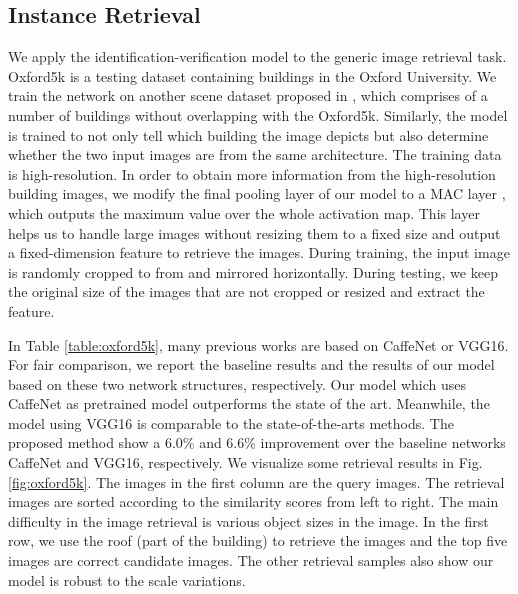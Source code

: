 \documentclass[journal]{IEEEtran}
\begin{document}
\subsection{Instance Retrieval}
We apply the identification-verification model to the generic image retrieval task. Oxford5k \cite{philbin2007object} is a testing dataset containing buildings in the Oxford University. We train the network on another scene dataset proposed in \cite{radenovic2016cnn}, which comprises of a number of buildings without overlapping with the Oxford5k. Similarly, the model is trained to not only tell which building the image depicts but also determine whether the two input images are from the same architecture. The training data is high-resolution. In order to obtain more information from the high-resolution building images, we modify the final pooling layer of our model to a MAC layer \cite{tolias2015particular}, which outputs the maximum value over the whole activation map. This layer helps us to handle large images without resizing them to a fixed size and output a fixed-dimension feature to retrieve the images. During training, the input image is randomly cropped to  from  and mirrored horizontally. During testing, we keep the original size of the images that are not cropped or resized and extract the feature.

In Table \ref{table:oxford5k}, many previous works are based on CaffeNet or VGG16. For fair comparison, we report the baseline results and the results of our model based on these two network structures, respectively. Our model which uses CaffeNet as pretrained model outperforms the state of the art. Meanwhile, the model using VGG16 is comparable to the state-of-the-arts methods. The proposed method show a 6.0\% and 6.6\% improvement over the baseline networks CaffeNet and VGG16, respectively. We visualize some retrieval results in Fig. \ref{fig:oxford5k}. The images in the first column are the query images. The retrieval images are sorted according to the similarity scores from left to right. The main difficulty in the image retrieval is various object sizes in the image. In the first row, we use the roof (part of the building) to retrieve the images and the top five images are correct candidate images. The other retrieval samples also show our model is robust to the scale variations.
\end{document}
